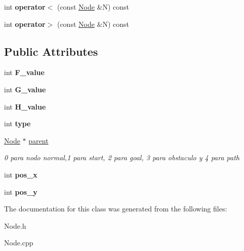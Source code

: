 \begin{DoxyCompactItemize}
\item 
\hypertarget{class_node_a6df353aa334e4273d90889aed8d2762b}{int {\bfseries operator$<$} (const \hyperlink{class_node}{Node} \&N) const }\label{class_node_a6df353aa334e4273d90889aed8d2762b}

\item 
\hypertarget{class_node_a5b3a60439297eff107faf6de1b5fc53a}{int {\bfseries operator$>$} (const \hyperlink{class_node}{Node} \&N) const }\label{class_node_a5b3a60439297eff107faf6de1b5fc53a}

\end{DoxyCompactItemize}
\subsection*{Public Attributes}
\begin{DoxyCompactItemize}
\item 
\hypertarget{class_node_abaac411cb792ada4aafd40f09cbbfeb3}{int {\bfseries F\+\_\+value}}\label{class_node_abaac411cb792ada4aafd40f09cbbfeb3}

\item 
\hypertarget{class_node_a204590a559408957a9828cb731be0262}{int {\bfseries G\+\_\+value}}\label{class_node_a204590a559408957a9828cb731be0262}

\item 
\hypertarget{class_node_a5fd0078658a5b48f612b7dc6edd9e4b2}{int {\bfseries H\+\_\+value}}\label{class_node_a5fd0078658a5b48f612b7dc6edd9e4b2}

\item 
\hypertarget{class_node_a86fcc8384153457dcc9bcaf65c8fbec3}{int {\bfseries type}}\label{class_node_a86fcc8384153457dcc9bcaf65c8fbec3}

\item 
\hypertarget{class_node_ad8184598cdea70e4bbdfd76f2b0f9e85}{\hyperlink{class_node}{Node} $\ast$ \hyperlink{class_node_ad8184598cdea70e4bbdfd76f2b0f9e85}{parent}}\label{class_node_ad8184598cdea70e4bbdfd76f2b0f9e85}

\begin{DoxyCompactList}\small\item\em 0 para nodo normal,1 para start, 2 para goal, 3 para obstaculo y 4 para path \end{DoxyCompactList}\item 
\hypertarget{class_node_a5fb3136718750eac5a24802ca095fd71}{int {\bfseries pos\+\_\+x}}\label{class_node_a5fb3136718750eac5a24802ca095fd71}

\item 
\hypertarget{class_node_ad53bede56c310225b514c8539f61077e}{int {\bfseries pos\+\_\+y}}\label{class_node_ad53bede56c310225b514c8539f61077e}

\end{DoxyCompactItemize}


The documentation for this class was generated from the following files\+:\begin{DoxyCompactItemize}
\item 
Node.\+h\item 
Node.\+cpp\end{DoxyCompactItemize}
